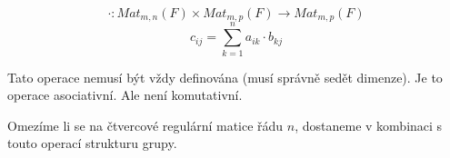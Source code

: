 \begin{definition}
    $$\cdot: Mat_{m,n}(F) \times Mat_{m,p}(F) \rightarrow Mat_{m,p}(F)$$
    $$c_{ij} = \sum_{k=1}^n a_{ik} \cdot b_{kj}$$

    Tato operace nemusí být vždy definována (musí správně sedět dimenze).
    Je to operace asociativní. Ale není komutativní.

    Omezíme li se na čtvercové regulární matice řádu $n$, dostaneme v kombinaci s touto operací
    strukturu grupy.
\end{definition}

